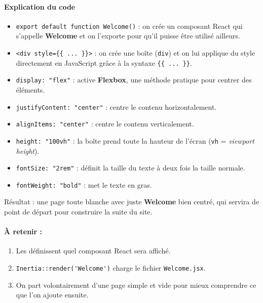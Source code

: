 \paragraph{Explication du code}
\begin{itemize}
    \item \verb|export default function Welcome()| : on crée un composant React qui s’appelle \textbf{Welcome} et on l’exporte pour qu’il puisse être utilisé ailleurs.
    \item \verb|<div style={{ ... }}>| : on crée une boîte (\texttt{div}) et on lui applique du style directement en JavaScript grâce à la syntaxe \verb|{{ ... }}|.
    \item \verb|display: "flex"| : active \textbf{Flexbox}, une méthode pratique pour centrer des éléments.
    \item \verb|justifyContent: "center"| : centre le contenu horizontalement.
    \item \verb|alignItems: "center"| : centre le contenu verticalement.
    \item \verb|height: "100vh"| : la boîte prend toute la hauteur de l’écran (\texttt{vh} = \textit{viewport height}).
    \item \verb|fontSize: "2rem"| : définit la taille du texte à deux fois la taille normale.
    \item \verb|fontWeight: "bold"| : met le texte en gras.
\end{itemize}

\begin{center}
\end{center}

Résultat : une page toute blanche avec juste \textbf{Welcome} bien centré, qui servira de point de départ pour construire la suite du site.

\paragraph{À retenir :}
\begin{enumerate}
    \item Les \routes{} définissent quel composant React sera affiché.
    \item \verb|Inertia::render('Welcome')| charge le fichier \verb|Welcome.jsx|.
    \item On part volontairement d’une page simple et vide pour mieux comprendre ce que l’on ajoute ensuite.
\end{enumerate}

